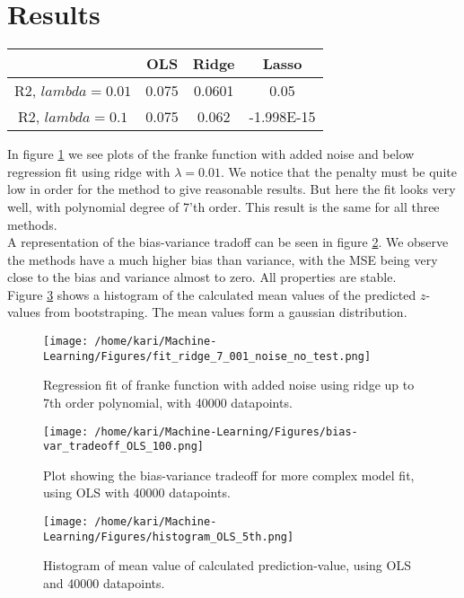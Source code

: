 \documentclass[a4paper,12pt, english]{article}
\begin{document}
\section*{Results}

\begin{center}
	\begin{tabular}{c c c c}
	 & OLS & Ridge & Lasso \\
	\hline
	R2, $lambda = 0.01$ & 0.075 & 0.0601 & 0.05 \\
	\hline
	R2, $lambda = 0.1$ & 0.075 & 0.062 & -1.998E-15 \\
	\hline
	\hline
	\end{tabular}
\end{center}

In figure \ref{fig:ridge} we see plots of the franke function with added noise and below regression fit using ridge with $\lambda = 0.01$. We notice that the penalty must be quite low in order for the method to give reasonable results. But here the fit looks very well, with polynomial degree of 7'th order. This result is the same for all three methods. \\
A representation of the bias-variance tradoff can be seen in figure \ref{fig:bias}. We observe the methods have a much higher bias than variance, with the MSE being very close to the bias and variance almost to zero. All properties are stable. \\
Figure \ref{fig:hist} shows a histogram of the calculated mean values of the predicted $z$-values from bootstraping. The mean values form a gaussian distribution.

\begin{figure}
\centering
\texttt{[image: /home/kari/Machine-Learning/Figures/fit\_ridge\_7\_001\_noise\_no\_test.png]}
\caption{Regression fit of franke function with added noise using ridge up to 7th order polynomial, with 40000 datapoints.}
\label{fig:ridge}
\end{figure}

\begin{figure}
\centering
\texttt{[image: /home/kari/Machine-Learning/Figures/bias-var\_tradeoff\_OLS\_100.png]}
\caption{Plot showing the bias-variance tradeoff for more complex model fit, using OLS with 40000 datapoints.}
\label{fig:bias}
\end{figure}

\begin{figure}
\centering
\texttt{[image: /home/kari/Machine-Learning/Figures/histogram\_OLS\_5th.png]}
\caption{Histogram of mean value of calculated prediction-value, using OLS and 40000 datapoints.}
\label{fig:hist}
\end{figure}
\end{document}
